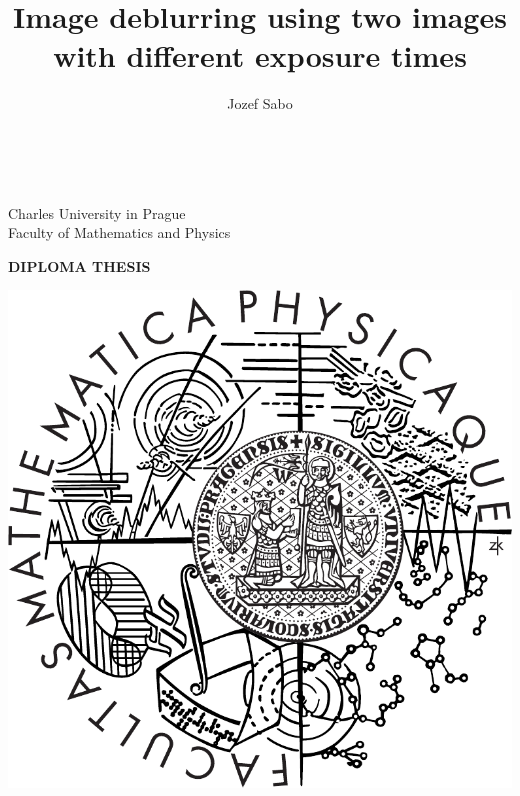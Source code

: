 \documentclass[12pt,notitlepage]{report}
\title{Image deblurring using two images with different exposure times}   %
\author{Jozef Sabo} %
\begin{document}

 \pagestyle{empty}
\begin{titlepage}
\begin{center}
\ \\

\vspace{15mm}

\large
Charles University in Prague\\
Faculty of Mathematics and Physics\\

\vspace{5mm}

{\Large\bf DIPLOMA THESIS}

\vspace{10mm}

\includegraphics[scale=0.3]{mff_logo.pdf}


\end{center}
\end{titlepage}
\end{document}
